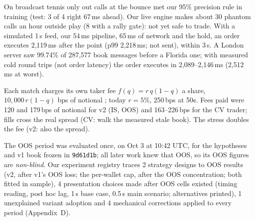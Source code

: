 \documentclass[11pt,letterpaper]{article}
\begin{document}
 On broadcast tennis only out calls at the bounce met our 95\% precision rule in
training (test: 3 of 4 right 67\,ms ahead). Our live engine makes about 30 phantom calls an hour outside play
(8 with a rally gate): not yet safe to trade. With a simulated 1\,s feed, our 54\,ms
pipeline, 65\,ms of network and the hold, an order executes 2,119\,ms after the point
(p99 2,218\,ms; not sent), within 3\,s. A London server saw
99.74\% of 287,577 book messages before a Florida one; with measured cold round
trips (not order latency) the order executes in
2,089--2,146\,ms (2,512\,ms at worst).

 Each match charges its own taker fee \(f(q) = r\,q(1-q)\) a share, \(10{,}000\,r(1-q)\) bps
of notional \citep[fee schedule]{pmapi}; today \(r = 5\%\), 250\,bps at 50¢.
Fees paid were 120 and 179\,bps of notional for v2 (IS, OOS) and
163–226\,bps for the CV trader; fills cross the real spread (CV: walk the measured stale book).
The stress doubles the fee (v2: also the spread).

 The OOS period was evaluated once, on
Oct 3 at 10:42 UTC, for the hypotheses and v1 book frozen in \texttt{9d61d1b}; all later work
knew that OOS, so its OOS figures are \emph{non-blind}. Our experiment registry traces 2
strategy designs to OOS results (v2, after v1's OOS loss; the per-wallet cap, after the OOS concentration; both fitted
in sample), 4 presentation choices made after OOS cells existed (timing reading, post hoc lag, 1\,s
base case, 0.5\,s main scenario; alternatives printed), 1 unexplained variant adoption and
4 mechanical corrections applied to every period (Appendix~D).

\end{document}
